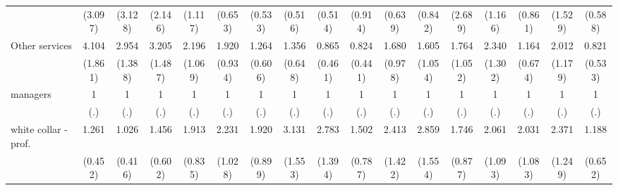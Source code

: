 {\begin{tabular}{l*{16}{c}}
                    &     (3.097)         &     (3.128)         &     (2.146)         &     (1.117)         &     (0.653)         &     (0.533)         &     (0.516)         &     (0.514)         &     (0.914)         &     (0.639)         &     (0.842)         &     (2.689)         &     (1.166)         &     (0.861)         &     (1.529)         &     (0.588)         \\
[1em]
Other services      &       4.104\sym{**} &       2.954\sym{*}  &       3.205\sym{*}  &       2.196         &       1.920         &       1.264         &       1.356         &       0.865         &       0.824         &       1.680         &       1.605         &       1.764         &       2.340         &       1.164         &       2.012         &       0.821         \\
                    &     (1.861)         &     (1.388)         &     (1.487)         &     (1.069)         &     (0.934)         &     (0.606)         &     (0.648)         &     (0.461)         &     (0.441)         &     (0.978)         &     (1.054)         &     (1.052)         &     (1.302)         &     (0.674)         &     (1.179)         &     (0.533)         \\
[1em]
managers            &           1         &           1         &           1         &           1         &           1         &           1         &           1         &           1         &           1         &           1         &           1         &           1         &           1         &           1         &           1         &           1         \\
                    &         (.)         &         (.)         &         (.)         &         (.)         &         (.)         &         (.)         &         (.)         &         (.)         &         (.)         &         (.)         &         (.)         &         (.)         &         (.)         &         (.)         &         (.)         &         (.)         \\
[1em]
white collar - prof.&       1.261         &       1.026         &       1.456         &       1.913         &       2.231         &       1.920         &       3.131\sym{*}  &       2.783\sym{*}  &       1.502         &       2.413         &       2.859         &       1.746         &       2.061         &       2.031         &       2.371         &       1.188         \\
                    &     (0.452)         &     (0.416)         &     (0.602)         &     (0.835)         &     (1.028)         &     (0.899)         &     (1.553)         &     (1.394)         &     (0.787)         &     (1.422)         &     (1.554)         &     (0.877)         &     (1.093)         &     (1.083)         &     (1.249)         &     (0.652)         \\

\end{tabular}}
